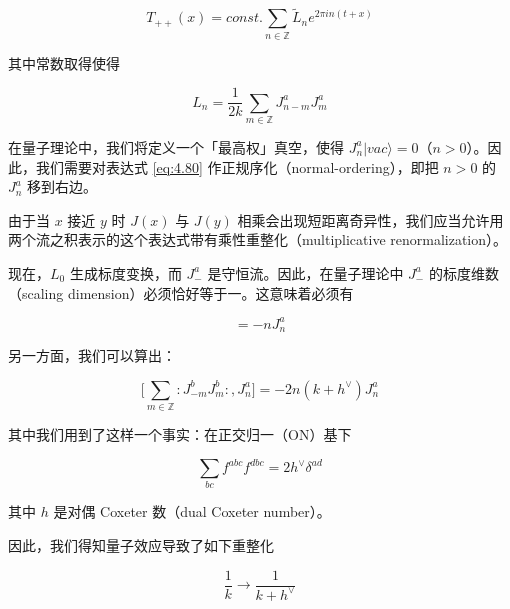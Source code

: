 \begin{equation}
  T_{++}(x)=\mathit{const.}\sum_{n\in\mathbb{Z}}\tilde L_n e^{2\pi i n(t+x)}
  \tag{4.79}
  \label{eq:4.79}
\end{equation}

其中常数取得使得

\begin{equation}
  L_n=\frac{1}{2k}\sum_{m\in\mathbb{Z}}J^a_{n-m}J^a_m
  \tag{4.80}
  \label{eq:4.80}
\end{equation}

在量子理论中，我们将定义一个「最高权」真空，使得 $J^a_n|vac\rangle=0$（$n>0$）。因此，我们需要对表达式 \eqref{eq:4.80} 作正规序化（normal-ordering），即把 $n>0$ 的 $J^a_n$ 移到右边。

由于当 $x$ 接近 $y$ 时 $J(x)$ 与 $J(y)$ 相乘会出现短距离奇异性，我们应当允许用两个流之积表示的这个表达式带有乘性重整化（multiplicative renormalization）。

现在，$L_0$ 生成标度变换，而 $J^a_-$ 是守恒流。因此，在量子理论中 $J^a_-$ 的标度维数（scaling dimension）必须恰好等于一。这意味着必须有

\begin{equation}
  [L_0,J^a_n]=-nJ^a_n
  \tag{4.81}
  \label{eq:4.81}
\end{equation}

另一方面，我们可以算出：

\begin{equation}
  \Big[\sum_{m\in\mathbb{Z}}:J^b_{-m}J^b_m:,J^a_n\Big]=-2n(k+h^\vee)J^a_n
  \tag{4.82}
  \label{eq:4.82}
\end{equation}

其中我们用到了这样一个事实：在正交归一（ON）基下

\begin{equation}
  \sum_{bc}f^{abc}f^{dbc}=2h^\vee\delta^{ad}
  \tag{4.83}
  \label{eq:4.83}
\end{equation}

其中 $h$ 是对偶 Coxeter 数（dual Coxeter number）。


因此，我们得知量子效应导致了如下重整化

\begin{equation}
  \frac{1}{k}\to\frac{1}{k+h^\vee}
  \tag{4.84}
  \label{eq:4.84}
\end{equation}


